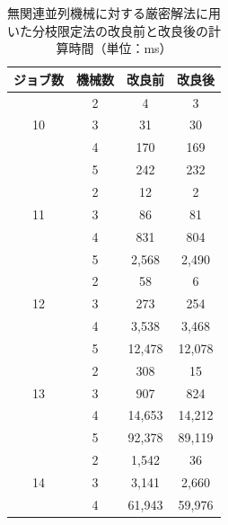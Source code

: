 \documentclass[12pt]{optlab-bachelor}
\begin{document}
\begin{table}[htb]
  \begin{center}
    \begin{tabular}{|c|c|c|c|} \hline
      ジョブ数 & 機械数 & 改良前 & 改良後 \\ \hline \hline
      & 2 & 4 & 3 \\ \cline{2-4}
      10 & 3 & 31 & 30  \\ \cline{2-4}
      & 4 & 170 & 169  \\ \cline{2-4}
      & 5 & 242 & 232 \\ \hline \hline
      & 2 & 12 & 2 \\ \cline{2-4}
      11 & 3 & 86 & 81 \\ \cline{2-4}
      & 4 & 831 & 804\\ \cline{2-4}
      & 5 & 2,568 & 2,490  \\ \hline \hline
      & 2 & 58 &  6 \\ \cline{2-4}
      12 & 3 & 273 & 254 \\ \cline{2-4}
      & 4 &  3,538 & 3,468 \\ \cline{2-4}
      & 5 & 12,478 &  12,078  \\ \hline \hline
      & 2 & 308 & 15 \\ \cline{2-4}
      13 & 3 & 907 & 824 \\ \cline{2-4}
      & 4 & 14,653 & 14,212 \\ \cline{2-4}
      & 5 & 92,378 & 89,119 \\ \hline \hline
      & 2 & 1,542 & 36 \\ \cline{2-4}
      14 & 3 & 3,141 & 2,660 \\ \cline{2-4}
      & 4 & 61,943 & 59,976 \\ \hline \hline
    \end{tabular}
    \caption{無関連並列機械に対する厳密解法に用いた分枝限定法の改良前と改良後の計算時間（単位：ms）}
    \label{A4}
  \end{center}
\end{table}
\end{document}
